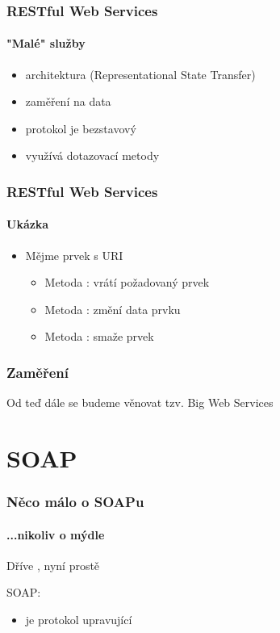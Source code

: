 \documentclass[12pt]{beamer}
\begin{document}
\begin{frame}
  \frametitle{RESTful Web Services}
  \framesubtitle{"Malé" služby}
	\begin{itemize}
		\item architektura  (Representational State Transfer)
		\item zaměření na data
		\item protokol je bezstavový
		\item využívá dotazovací metody 
	\end{itemize}
\end{frame}

\begin{frame}
	\frametitle{RESTful Web Services}
	\framesubtitle{Ukázka}
	\begin{itemize}
		\item Mějme prvek s URI 
		\begin{itemize}
			\item Metoda : vrátí požadovaný prvek
			\item Metoda : změní data prvku
			\item Metoda : smaže prvek
		\end{itemize}
	\end{itemize}
	
\end{frame}

\begin{frame}
  \frametitle{Zaměření}

  \begin{example}
    Od teď dále se budeme věnovat tzv. Big Web Services
  \end{example}
\end{frame}

\section{SOAP}

\begin{frame}
  \frametitle{Něco málo o SOAPu}
  \framesubtitle{...nikoliv o mýdle}

  Dříve , nyní prostě 

  \begin{block}{SOAP:}
    \begin{itemize}
      \item je protokol upravující
    \end{itemize}
  \end{block}
\end{frame}
\end{document}
